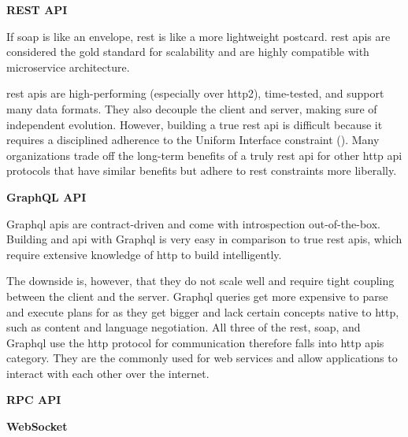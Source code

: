       \begin{multicols}{2}
      \textbf{REST API}

      If \acrshort{soap} is like an envelope, \acrshort{rest} is like a  more lightweight postcard. \acrshort{rest} 
      \acrshort{api}s are considered the gold standard for scalability and are highly compatible with microservice 
      architecture. 

      \acrshort{rest} \acrshort{api}s are high-performing (especially over \acrshort{http}2), time-tested, and support 
      many data formats. They also decouple the client and server, making sure of independent evolution. However,
      building a true \acrshort{rest} \acrshort{api} is difficult because it requires a disciplined adherence to the 
      Uniform Interface constraint (\cite{restapiuniforminterface}). Many organizations trade off the long-term benefits
      of a truly \acrshort{rest} \acrshort{api} for other \acrshort{http} \acrshort{api} protocols that have similar 
      benefits but adhere to \acrshort{rest} constraints more liberally.
      
      \textbf{GraphQL API}

      Graph\acrshort{ql} \acrshort{api}s are contract-driven and come with introspection out-of-the-box. Building and
      \acrshort{api} with Graph\acrshort{ql} is very easy in comparison to true \acrshort{rest} \acrshort{api}s, 
      which require extensive knowledge of \acrshort{http} to build intelligently.

      The downside is, however, that they do not scale well and require tight coupling between the client and the 
      server. Graph\acrshort{ql} queries get more expensive to parse and execute plans for as they get bigger and
      lack certain concepts native to \acrshort{http}, such as content and language negotiation. All three of the
      \acrshort{rest}, \acrshort{soap}, and Graph\acrshort{ql} use the \acrshort{http} protocol for communication
      therefore falls into \acrshort{http} \acrshort{api}s category. They are the commonly used for web services 
      and allow applications to interact with each other over the internet.

      \textbf{RPC API} %

      \textbf{WebSocket}
      

\end{multicols}
